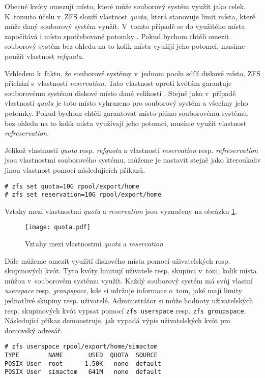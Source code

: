 Obecné kvóty omezují místo, které může souborový systém využít jako celek. K~tomuto účelu v~ZFS slouží vlastnost \emph{quota}, která stanovuje limit místa, které může daný souborový systém využít. V~tomto případě se do využitého místa započítává i místo spotřebované potomky \cite{quotas}. Pokud bychom chtěli omezit souborový systém bez ohledu na to kolik místa využijí jeho potomci, musíme použít vlastnost \emph{refquota}.

Vzhledem k~faktu, že souborové systémy v~jednom poolu sdílí diskové místo, ZFS přichází s~vlastností \emph{reservation}. Tato vlastnost oproti kvótám garantuje souborovému systému diskové místo dané velikosti \cite{quotas}. Stejně jako v~případě vlastnosti \emph{quota} je toto místo vyhrazeno pro souborový systém a všechny jeho potomky. Pokud bychom chtěli garantovat místo přímo souborovému systému, bez ohledu na to kolik místa využívají jeho potomci, musíme využít vlastnost \emph{refreservation}.

Jelikož vlastnosti \emph{quota} resp. \emph{refquota} a vlastnosti \emph{reservation} resp. \emph{refreservation} jsou vlastnostmi souborového systému, můžeme je nastavit stejně jako kteroukoliv jinou vlastnost pomocí následujících příkazů.
\begin{verbatim}
# zfs set quota=10G rpool/export/home
# zfs set reservation=10G rpool/export/home
\end{verbatim}

Vztahy mezi vlastnostmi \emph{quota} a \emph{reservation} jsou vyznačeny na obrázku \ref{quotavsreserv}.
\begin{figure}
    \centering
    \texttt{[image: quota.pdf]}
    \caption{Vztahy mezi vlastnostmi \emph{quota} a \emph{reservation}}
    \label{quotavsreserv}
\end{figure}

Dále můžeme omezit využití diskového místa pomocí uživatelských resp. skupinových kvót. Tyto kvóty limitují uživatele resp. skupinu v~tom, kolik místa můžou v~souborovém systému využít. Každý souborový systém má svůj vlastní \emph{userspace} resp. \emph{groupspace}, kde si udržuje informace o~tom, jaké mají limity jednotlivé skupiny resp. uživatelé.
Administrátor si může hodnoty uživatelských resp. skupinových kvót vypsat pomocí \verb|zfs userspace| resp. \verb|zfs groupspace|. Následující příkaz demonstruje, jak vypadá výpis uživatelských kvót pro domovský adresář.
\begin{verbatim}
# zfs userspace rpool/export/home/simactom
TYPE        NAME       USED  QUOTA  SOURCE
POSIX User  root      1.50K   none  default
POSIX User  simactom   641M   none  default
\end{verbatim}

